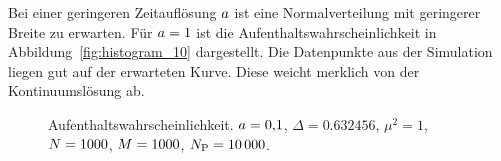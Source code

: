 Bei einer geringeren Zeitauflösung $a$ ist eine Normalverteilung mit
geringerer Breite zu erwarten. Für $a = \num{1}$ ist die
Aufenthaltswahrscheinlichkeit in Abbildung~\ref{fig:histogram_10} dargestellt.
Die Datenpunkte aus der Simulation liegen gut auf der erwarteten Kurve. Diese
weicht merklich von der Kontinuumslösung ab.

\begin{figure}[htbp]
    \centering
    \caption{%
        Aufenthaltswahrscheinlichkeit. $a =
        \num{0.1}$, $\Delta = \num{0.632456}$, $\mu^2 = \num{1}$, $N =
        \num{1000}$, $M = \num{1000}$, $N_\text P = \num{10000}$.
    }
    \label{fig:histogram_01}
\end{figure}

